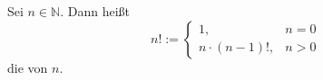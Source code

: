 Sei $n \in \mathbb{N}$. Dann heißt 
$$
n! := \begin{cases}
1, & n=0 \\
n \cdot (n-1)!, & n>0
\end{cases}
$$
die  von $n$.